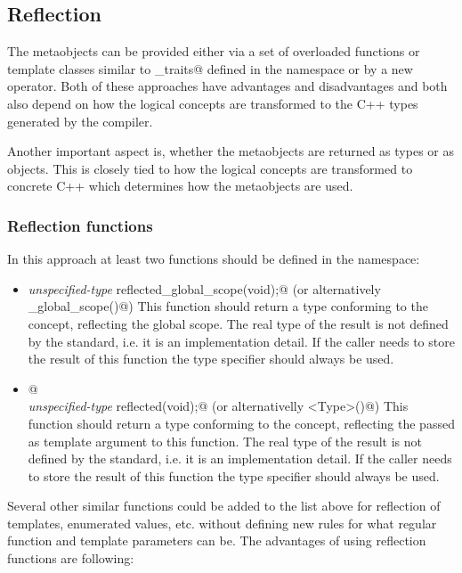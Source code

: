 \subsection{Reflection}

The metaobjects can be provided either via a set of overloaded
functions or template classes similar to \verb@type_traits@ defined
in the \verb@std@ namespace or by a new operator.
Both of these approaches have advantages and disadvantages
and both also depend on how the logical concepts are transformed to
the C++ types generated by the compiler.

Another important aspect is, whether the metaobjects are returned
as types or as objects. This is closely tied to how the logical concepts
are transformed to concrete C++ which determines how the metaobjects
are used.

\subsubsection{Reflection functions}

In this approach at least two functions should be defined
in the \verb@std@ namespace:

\begin{itemize}
	\item{{\em unspecified-type} \verb@ reflected_global_scope(void);@} (or
	alternatively \verb@mirrored_global_scope()@)
	This function should return a type conforming to the {}
	concept, reflecting the global scope.
	The real type of the result is not defined by the standard, i.e. it is an implementation detail. 
	If the caller needs to store the result of this function the \verb@auto@ type
	specifier should always be used.

	\item{\verb@template <typename Type>@\\
	{\em unspecified-type} \verb@ reflected(void);@} (or alternativelly \verb@mirrored<Type>()@)
	This function should return a type conforming to the {}
	concept, reflecting the \verb@Type@ passed as template argument to this function.
	The real type of the result is not defined by the standard, i.e. it is an implementation detail. 
	If the caller needs to store the result of this function the \verb@auto@ type
	specifier should always be used.
\end{itemize}

Several other similar functions could be added to the list above
for reflection of templates, enumerated values, etc. without defining
new rules for what regular function and template parameters can be.
The advantages of using reflection functions are following:

